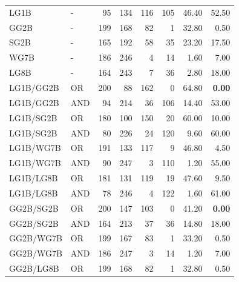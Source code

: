 \documentclass{article}
\begin{document}
{\begin{longtable}{llrrrrrr}
LG1B                     & -       &   95 &  134 &  116 &  105 & 46.40             & 52.50             \\
 GG2B                     & -       &  199 &  168 &   82 &    1 & 32.80             & 0.50              \\
 SG2B                     & -       &  165 &  192 &   58 &   35 & 23.20             & 17.50             \\
 WG7B                     & -       &  186 &  246 &    4 &   14 & 1.60              & 7.00              \\
 LG8B                     & -       &  164 &  243 &    7 &   36 & 2.80              & 18.00             \\
 LG1B/GG2B                & OR      &  200 &   88 &  162 &    0 & 64.80             & \textbf{0.00}     \\
 LG1B/GG2B                & AND     &   94 &  214 &   36 &  106 & 14.40             & 53.00             \\
 LG1B/SG2B                & OR      &  180 &  100 &  150 &   20 & 60.00             & 10.00             \\
 LG1B/SG2B                & AND     &   80 &  226 &   24 &  120 & 9.60              & 60.00             \\
 LG1B/WG7B                & OR      &  191 &  133 &  117 &    9 & 46.80             & 4.50              \\
 LG1B/WG7B                & AND     &   90 &  247 &    3 &  110 & 1.20              & 55.00             \\
 LG1B/LG8B                & OR      &  181 &  131 &  119 &   19 & 47.60             & 9.50              \\
 LG1B/LG8B                & AND     &   78 &  246 &    4 &  122 & 1.60              & 61.00             \\
 GG2B/SG2B                & OR      &  200 &  147 &  103 &    0 & 41.20             & \textbf{0.00}     \\
 GG2B/SG2B                & AND     &  164 &  213 &   37 &   36 & 14.80             & 18.00             \\
 GG2B/WG7B                & OR      &  199 &  167 &   83 &    1 & 33.20             & 0.50              \\
 GG2B/WG7B                & AND     &  186 &  247 &    3 &   14 & 1.20              & 7.00              \\
 GG2B/LG8B                & OR      &  199 &  168 &   82 &    1 & 32.80             & 0.50              \\

\end{longtable}}
\end{document}
